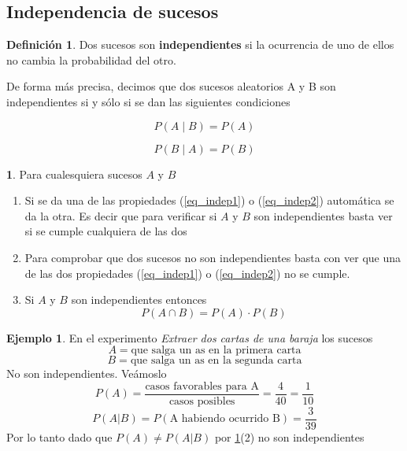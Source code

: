\documentclass[]{book}
\theoremstyle{plain}
\theoremstyle{definition}
\newtheorem{definition}[theorem]{Definición}
\newtheorem{example}[theorem]{Ejemplo}
\theoremstyle{definition} %
\newcommand{\thistheoremname}{}
\newtheorem{genericthm}[theorem]{\thistheoremname}
\newenvironment{customdef}[1]
  {\renewcommand{\thistheoremname}{#1}%
   \begin{genericthm}}
  {\end{genericthm}}
\begin{document}
\subsection{Independencia de sucesos}

\begin{definition}
  Dos sucesos son \textbf{independientes} si la ocurrencia de uno de ellos no cambia la probabilidad del otro.

  De forma más precisa, decimos que dos sucesos aleatorios A y B son independientes si y sólo si se dan las siguientes condiciones
   
\begin{equation}
  \label{eq_indep1} P(A \mid B) = P(A)
\end{equation}

\begin{equation}
  \label{eq_indep2} P(B\mid A) = P(B)
\end{equation}

\end{definition}

\begin{customdef}{Propiedades}\label{prop_cond_indep}
  Para cualesquiera sucesos $A$ y $B$
  \begin{enumerate}[(1)]
    \item Si se da una de las propiedades (\ref{eq_indep1}) o (\ref{eq_indep2}) automática se da la otra. 
    Es decir que para verificar si $A$ y $B$ son independientes basta ver si se cumple cualquiera de las dos
    \item Para comprobar que dos sucesos no son independientes basta con ver que una de las dos propiedades 
     (\ref{eq_indep1}) o (\ref{eq_indep2}) no se cumple.
    \item Si $A$ y $B$ son independientes entonces 
    \[P(A\cap B) = P(A) \cdot P(B)\]
  \end{enumerate}
\end{customdef}

\begin{example}
  En el experimento  \emph{Extraer dos cartas de una baraja} los sucesos 
  \[A = \text{que salga un as en la primera carta}\] 
  \[B = \text{que salga un as en la segunda carta}\] 
  No son independientes. Veámoslo 
  \[P(A) = \frac{\text{casos favorables para A}}{\text{casos posibles}} = \frac{4}{40} = \frac{1}{10} \]
  \[P(A|B) = P(\text{A habiendo ocurrido B}) = \frac{3}{39} \]
  Por lo tanto dado que $P(A) \not= P(A|B)$ por \ref{prop_cond_indep}(2) no son independientes
\end{example}
\end{document}
